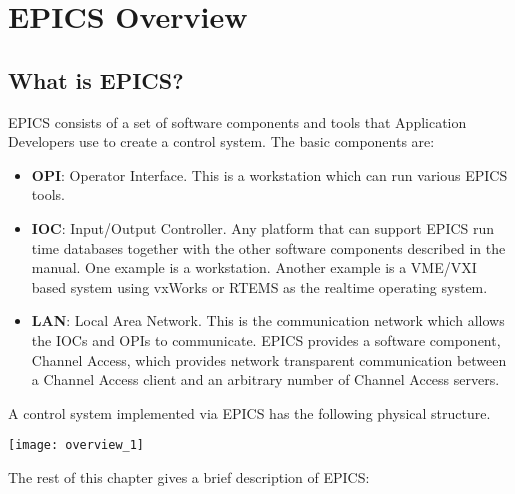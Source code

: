 \chapter{EPICS Overview}

\section{What is EPICS?}

EPICS consists of a set of software components and tools that Application Developers use to create a control system. The basic components are:

\begin{itemize}
\item \textbf{\textbf{OPI}}: Operator Interface. This is a workstation which can run various EPICS tools.

\item \textbf{\textbf{IOC}}: Input/Output Controller. Any platform that can support EPICS run time databases together with the other 
software components described in the manual. One example is a workstation. Another example is a VME/VXI 
based system using vxWorks or RTEMS as the realtime operating system.

\item \textbf{\textbf{LAN}}: Local Area Network. This is the communication network which allows the IOCs and OPIs to communicate. 
EPICS provides a software component, Channel Access, which provides network transparent communication 
between a Channel Access client and an arbitrary number of Channel Access servers.

\end{itemize}
A control system implemented via EPICS has the following physical structure.

\begin{center}
\texttt{[image: overview\_1]}
\end{center}

\noindent The rest of this chapter gives a brief description of EPICS:

